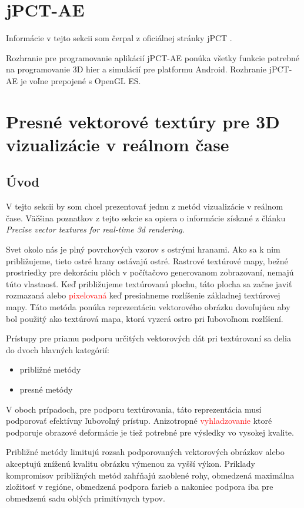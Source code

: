 \section{jPCT-AE}

Informácie v tejto sekcii som čerpal z oficiálnej stránky jPCT \cite{ols}.

Rozhranie pre programovanie aplikácií jPCT-AE ponúka všetky funkcie potrebné na programovanie 3D hier a simulácií pre platformu Android. Rozhranie jPCT-AE je voľne prepojené s OpenGL ES.

\section{Presné vektorové textúry pre 3D vizualizácie v reálnom čase}

\subsection{Úvod}

V tejto sekcii by som chcel prezentovať jednu z metód vizualizácie v reálnom čase. Väčšina poznatkov z tejto sekcie sa opiera o informácie získané z článku  {\itshape Precise vector textures for real-time 3d rendering.} \cite{qmk08}

Svet okolo nás je plný povrchových vzorov s ostrými hranami. Ako sa k nim približujeme, tieto ostré hrany ostávajú ostré. Rastrové textúrové mapy, bežné prostriedky pre dekoráciu plôch v počítačovo generovanom zobrazovaní, nemajú túto vlastnosť. Keď približujeme textúrovanú plochu, táto plocha sa začne javiť rozmazaná alebo \textcolor{red}{pixelovaná} keď presiahneme rozlíšenie základnej textúrovej mapy. Táto metóda ponúka reprezentáciu vektorového obrázku dovoľujúcu aby bol použitý ako textúrová mapa, ktorá vyzerá ostro pri ľubovoľnom rozlíšení.

Prístupy pre priamu podporu určitých vektorových dát pri textúrovaní sa delia do dvoch hlavných kategórií:
\begin{itemize}
\item približné metódy
\item presné metódy
\end{itemize}
V oboch prípadoch, pre podporu textúrovania, táto reprezentácia musí podporovať efektívny ľubovoľný prístup. Anizotropné \textcolor{red}{vyhladzovanie} ktoré podporuje obrazové deformácie je tiež potrebné pre výsledky vo vysokej kvalite.

Približné metódy limitujú rozsah podporovaných vektorových obrázkov alebo akceptujú zníženú kvalitu obrázku výmenou za vyšší výkon. Príklady kompromisov približných metód zahŕňajú zaoblené rohy, obmedzená maximálna zložitosť v regióne, obmedzená podpora farieb a nakoniec podpora iba pre obmedzenú sadu oblých primitívnych typov.

